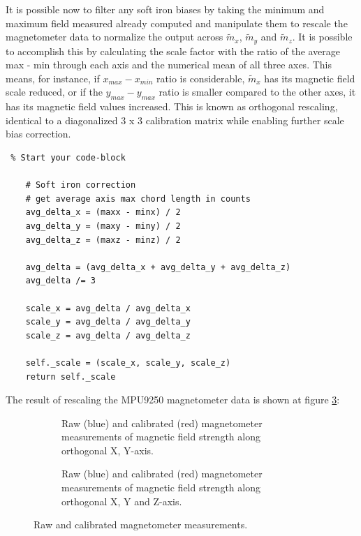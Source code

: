 It is possible now to filter any soft iron biases by taking the minimum and maximum field measured already computed and manipulate them to rescale the magnetometer data to normalize the output across $\widetilde{m}_x$, $\widetilde{m}_y$ and $\widetilde{m}_z$. It is possible to accomplish this by calculating the scale factor with the ratio of the average max - min through each axis and the numerical mean of all three axes. This means, for instance, if $x_{max} - x_{min}$ ratio is considerable, $\widetilde{m}_x$ has its magnetic field scale reduced, or if the $y_{max} - y_{max}$ ratio is smaller compared to the other axes, it has its magnetic field values increased. This is known as orthogonal rescaling, identical to a diagonalized 3 x 3 calibration matrix while enabling further scale bias correction.

\lstset{language=Python}
\begin{lstlisting} % Start your code-block

    # Soft iron correction
    # get average axis max chord length in counts
    avg_delta_x = (maxx - minx) / 2
    avg_delta_y = (maxy - miny) / 2
    avg_delta_z = (maxz - minz) / 2

    avg_delta = (avg_delta_x + avg_delta_y + avg_delta_z)
    avg_delta /= 3

    scale_x = avg_delta / avg_delta_x
    scale_y = avg_delta / avg_delta_y
    scale_z = avg_delta / avg_delta_z

    self._scale = (scale_x, scale_y, scale_z)
    return self._scale

\end{lstlisting}

The result of rescaling the MPU9250 magnetometer data is shown at figure \ref{fig:mag_calibration_output}:

\begin{figure}[H]
    \centering
    \begin{subfigure}{0.49\textwidth}
        \centering
        \resizebox{1\linewidth}{!}{}
        \caption{Raw (blue) and calibrated (red) magnetometer measurements of magnetic field strength along orthogonal X, Y-axis.}
        \label{fig:magnetometer_calibrated2D}
    \end{subfigure}
    \begin{subfigure}{0.49\textwidth}
        \centering
        \resizebox{1\linewidth}{!}{}
        \caption{Raw (blue) and calibrated (red) magnetometer measurements of magnetic field strength along orthogonal X, Y and Z-axis.}
        \label{fig:magnetometer_calibrated3D}
    \end{subfigure}
    \caption{Raw and calibrated magnetometer measurements.}
    \label{fig:mag_calibration_output}
\end{figure}

